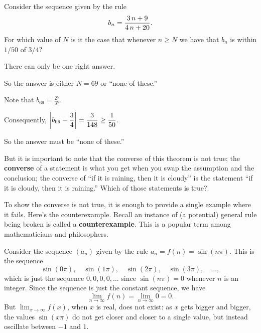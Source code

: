 \documentclass{ximera}
\newcommand{\defnword}[1]{\textbf{#1}}
\begin{document}
\begin{question}
  Consider the sequence given by the rule \[b_{n} = \displaystyle\displaystyle\frac{ 3 \, n + 9 }{ 4 \, n + 20 }.\]  For which value of \(N\) is it the case that whenever \(n \geq N\) we have that \(b_{n}\) is within \(1/50\) of \(3/4\)?

  \begin{solution}
    \begin{hint}
      There can only be one right answer.
    \end{hint}
    \begin{hint}
      So the answer is either \(N = 69\) or ``none of these.''
    \end{hint}
    \begin{hint}
      Note that \(b_{69} = \displaystyle\frac{27}{37}\).
    \end{hint}
    \begin{hint}
      Consequently, \(\left| b_{69} - \displaystyle \displaystyle\frac{3}{4} \right| = \displaystyle\frac{3}{148} \geq \displaystyle\frac{1}{50}\).
    \end{hint}
    \begin{hint}
      So the answer must be ``none of these.''
    \end{hint}

    \begin{multiple-choice}
    \end{multiple-choice}

  \end{solution}
\end{question}

But it is important to note that the converse of this theorem is not
true; \label{sidenote:raining-converse}the \defnword{converse} of a
statement is what you get when you swap the assumption and the
conclusion; the converse of ``if it is raining, then it is cloudy'' is
the statement ``if it is cloudy, then it is raining.''  Which of those
statements is true?.

To show the converse is not true, it is enough to provide a single
example where it fails.  Here's the counterexample.  Recall an
instance of (a potential) general rule being broken is called a
\defnword{counterexample}.  This is a popular term among
mathematicians and philosophers.

\begin{example}
  Consider the sequence $(a_n)$ given by the rule $a_n = f(n)=\sin(n\pi)$.  This is the sequence
$$
  \sin(0\pi),\quad \sin(1\pi),\quad\sin(2\pi),\quad\sin(3\pi),\quad\ldots,
$$
which is just the sequence $0, 0, 0, 0, \ldots$ since $\sin(n\pi)=0$
whenever $n$ is an integer.  Since the sequence is just the constant sequence, we have
$$
\lim_{n\to\infty} f(n)= \lim_{n\to\infty} 0 = 0. 
$$But $\displaystyle\lim_{x\to\infty}f(x)$, when $x$ is real, does not exist: as $x$ gets
bigger and bigger, the values $\sin(x\pi)$ do not get closer and
closer to a single value, but instead oscillate between $-1$ and $1$.
\end{example} 
\end{document}
